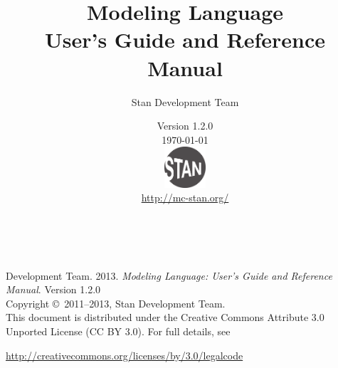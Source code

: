 \title{\Huge\bf \Stan Modeling Language \\[4pt] {\LARGE User's Guide
    and Reference Manual}}
\author{Stan Development Team
}

\date{\vspace*{36pt} \Stan Version 1.2.0 \\[4pt] {\small \today}
\\[36pt]
{
\vfill
\includegraphics[width=0.6in]{../../../logos/stanlogo-main.pdf}}
\\
\vspace*{6pt}
{\small \url{http://mc-stan.org/}}
}
\maketitle

\newpage
\thispagestyle{empty}
\mbox{ }
\vfill
\begin{center}
\begin{minipage}[t]{0.75\textwidth}
\small
\Stan Development Team. 2013.  
{\it \Stan Modeling Language: User's Guide and Reference Manual}. Version
1.2.0
\vspace*{20pt}
\mbox{ }
\\
Copyright \copyright \ 2011--2013, Stan Development Team.
\vspace*{28pt}
\mbox{} \\
This document is distributed under the Creative Commons Attribute 3.0
Unported License (CC BY 3.0).  For full details, see
\begin{center}
\url{http://creativecommons.org/licenses/by/3.0/legalcode} 
\end{center}
\end{minipage}
\vspace*{24pt}
\mbox{ }
\end{center}
